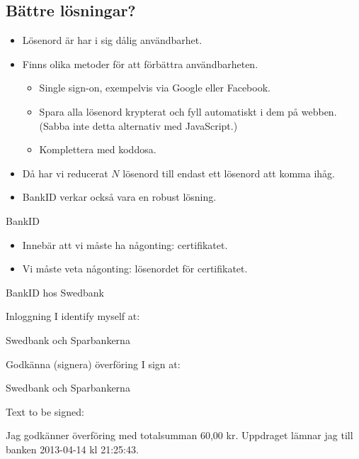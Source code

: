 \subsection{Bättre lösningar?}

\begin{frame}
  \begin{itemize}
    \item Lösenord är har i sig dålig användbarhet.

    \item Finns olika metoder för att förbättra användbarheten.
      \begin{itemize}
        \item Single sign-on, exempelvis via Google eller Facebook.
        \item Spara alla lösenord krypterat och fyll automatiskt i dem på 
          webben.
          (Sabba inte detta alternativ med JavaScript.)
        \item Komplettera med koddosa.
      \end{itemize}

    \item Då har vi reducerat \(N\) lösenord till endast ett lösenord att komma 
      ihåg.

      \pause{}

    \item BankID verkar också vara en robust lösning.

  \end{itemize}
\end{frame}

\begin{frame}{BankID}
  \begin{itemize}
    \item Innebär att vi måste ha någonting: certifikatet.
    \item Vi måste veta någonting: lösenordet för certifikatet.
  \end{itemize}
\end{frame}

\begin{frame}{BankID hos Swedbank}
  \begin{block}{Inloggning}
    I identify myself at:
    
    Swedbank och Sparbankerna
  \end{block}
  \begin{block}{Godkänna (signera) överföring}
    I sign at:
    
    Swedbank och Sparbankerna

    \vspace{1em}
    Text to be signed:

    Jag godkänner överföring med totalsumman 60,00 kr.
    Uppdraget lämnar jag till banken 2013-04-14 kl 21:25:43.
  \end{block}
\end{frame}


